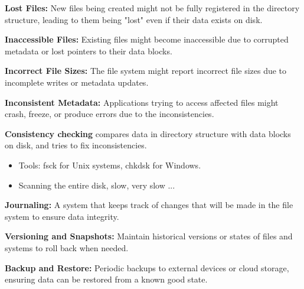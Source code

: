 \begin{slide}
    

    \textbf{Lost Files:} New files being created might not be fully registered in the directory structure, leading to them being "lost" even if their data exists on disk.
    \bigskip

    \textbf{Inaccessible Files:} Existing files might become inaccessible due to corrupted metadata or lost pointers to their data blocks.
    \bigskip
    
    \textbf{Incorrect File Sizes:} The file system might report incorrect file sizes due to incomplete writes or metadata updates.
    \bigskip

    \textbf{Inconsistent Metadata:} Applications trying to access affected files might crash, freeze, or produce errors due to the inconsistencies.

\end{slide}

\begin{slide}


    \textbf{Consistency checking} compares data in directory structure with data blocks on disk, and tries to fix inconsistencies.
    \begin{itemize}
        \item Tools: fsck for Unix systems, chkdsk for Windows.
        \item Scanning the entire disk, slow, very slow ...
    \end{itemize}
    \bigskip

    \textbf{Journaling:} A system that keeps track of changes that will be made in the file system to ensure data integrity.
    \bigskip

    \textbf{Versioning and Snapshots:} Maintain historical versions or states of files and systems to roll back when needed.
    \bigskip

    \textbf{Backup and Restore:} Periodic backups to external devices or cloud storage, ensuring data can be restored from a known good state.

\end{slide}

